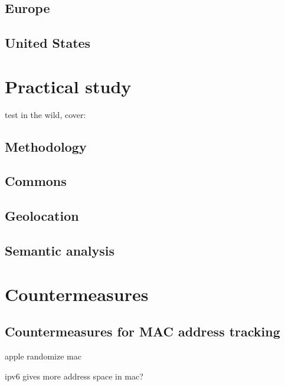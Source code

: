 \documentclass[12pt,a4paper,oneside,pdftex]{report}
\begin{document}
\section{Europe}

\section{United States}




\chapter{Practical study}
\label{chapter:practical}

test in the wild, cover:

\section{Methodology}
\label{sec:methods}

\section{Commons}
\label{sec:practical_commons}

\section{Geolocation}
\label{sec:practical_geo}

\section{Semantic analysis}
\label{sec:practical_semantic}





\chapter{Countermeasures}
\label{chapter:countermeasures}

\section{Countermeasures for MAC address tracking}
apple randomize mac

ipv6 gives more address space in mac?
\end{document}
